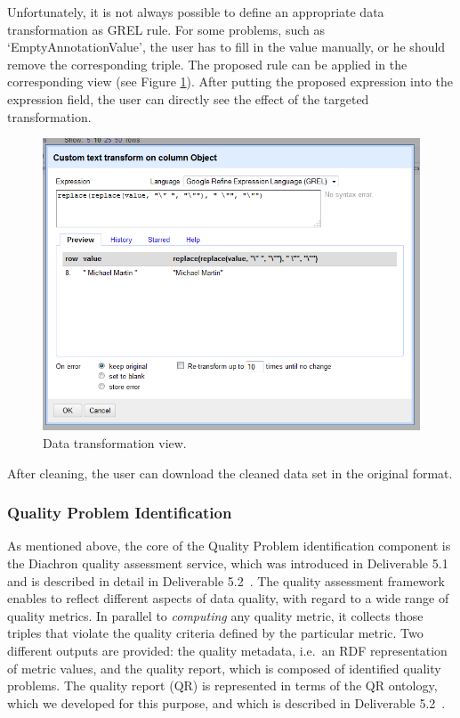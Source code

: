 Unfortunately, it is not always possible to define an appropriate data transformation as GREL rule. 
For some problems, such as `EmptyAnnotationValue', the user has to fill in the value manually, or he should remove the corresponding triple.
The proposed rule can be applied in the corresponding view (see Figure \ref{fig:transformation}). After putting the proposed expression into the expression field, the user can directly see the effect of the targeted transformation. 
\begin{figure}[ht!]
\centering
\includegraphics[width=.75\textwidth]{figures/transformation.png}
\caption{Data transformation view.}
\label{fig:transformation}
\end{figure}
After cleaning, the user can download the cleaned data set in the original format.


\subsubsection{Quality Problem Identification}

As mentioned above, the core of the Quality Problem identification component is the Diachron quality assessment service, which was introduced in Deliverable 5.1~\cite{diachron-d5.1} and is described in detail in Deliverable 5.2~\cite{diachron-d5.2}.
The quality assessment framework enables to reflect different aspects of data quality, with regard to a wide range of quality metrics.
In parallel to \emph{computing} any quality metric, it collects those triples that violate the quality criteria defined by the particular metric. 
Two different outputs are provided: the quality metadata, i.e.\ an RDF representation of metric values, and the quality report, which is composed of identified quality problems.
The quality report (QR) is represented in terms of the QR ontology, which we developed for this purpose, and which is described in Deliverable 5.2~\cite[section 2.1.1]{diachron-d5.2}.

